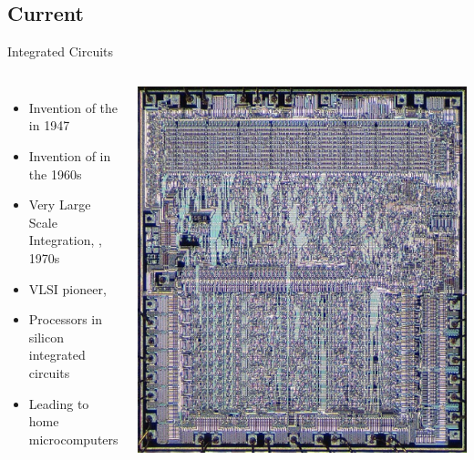 \documentclass{beamer}
\begin{document}
\subsection[Modern]{Current}

\begin{frame}{Integrated Circuits}
  \begin{columns}
    
    \begin{itemize}
    \item
      Invention of the \cite{Transistor} in 1947
    \item
      Invention of \cite{ICs} in the 1960s
    \item
      Very Large Scale Integration, \cite{VLSI}, 1970s
    \item
      VLSI pioneer, \cite{LynnConway}
    \item
      Processors in silicon integrated circuits
    \item
      Leading to home microcomputers
    \end{itemize}
    
    \begin{center}
      \includegraphics[scale=0.25]{../assets/MOS_6502_Die.eps}
      \cite{MOS6502Die}
    \end{center}
    
  \end{columns}
\end{frame}
\end{document}
